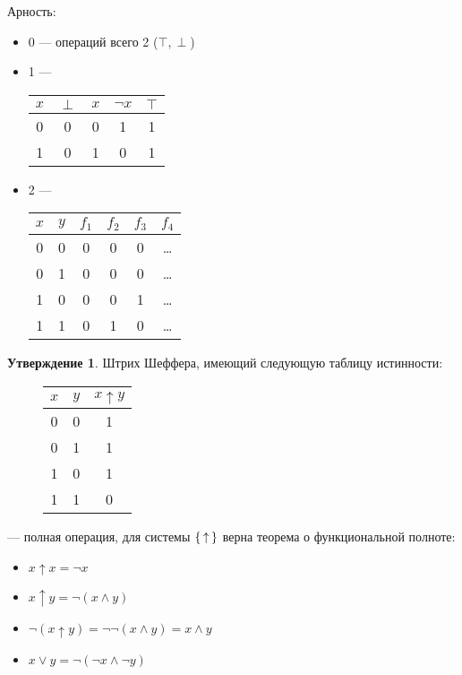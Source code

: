 \documentclass[12pt]{article}
\let\n\neg
\theoremstyle{definition}
\theoremstyle{statement}
\newtheorem{statement}{Утверждение}[section]
\theoremstyle{theorem}
\begin{document}
Арность:
\begin{itemize}
  \item 0 --- операций всего 2 ($\top, \perp$)

  \item 1 ---
    \begin{tabular}{c||c|c|c|c}
      $x$ & $\perp$ & $x$ & $\n x$ & $\top$\\\hline
      0 & 0 & 0 & 1 & 1\\\hline
      1 & 0 & 1 & 0 & 1
    \end{tabular}

  \item 2 ---
    \begin{tabular}{c|c||c|c|c|c}
      $x$ & $y$ & $f_1$ & $f_2$ & $f_3$ & $f_4$\\\hline
      0 & 0 & 0 & 0 & 0 & \dots\\\hline
      0 & 1 & 0 & 0 & 0 & \dots\\\hline
      1 & 0 & 0 & 0 & 1 & \dots\\\hline
      1 & 1 & 0 & 1 & 0 & \dots\\
    \end{tabular}
\end{itemize}
\begin{statement}
  Штрих Шеффера, имеющий следующую таблицу истинности:
  \begin{figure}[H]
    \centering
    \begin{tabular}{c|c|c}
      $x$ & $y$ & $x \uparrow y$\\\hline
      0 & 0 & 1\\\hline
      0 & 1 & 1\\\hline
      1 & 0 & 1\\\hline
      1 & 1 & 0
    \end{tabular}
  \end{figure}
  --- полная операция, для системы $\set{ \uparrow }$ верна
  теорема о функциональной полноте:
  \begin{itemize}
    \item $x \uparrow x = \n x$

    \item $x \uparrow y = \n(x \land y)$

    \item $\n (x \uparrow y) = \n \n (x \land y) = x \land y$

    \item $x \lor y = \n (\n x \land \n y)$
  \end{itemize}
\end{statement}
\end{document}
